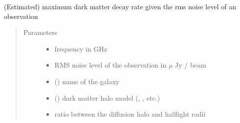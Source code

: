 \documentclass[letterpaper,10pt,english]{sphinxmanual}
\begin{document}
\begin{fulllineitems}
\label{\detokenize{diffsph:diffsph.limits.decay_rate_limest}}
\sphinxAtStartPar
(Estimated) maximum dark matter decay rate given the rms noise level of an observation
\begin{quote}\begin{description}
\item[{Parameters}] \leavevmode\begin{itemize}
\item {} 
\sphinxAtStartPar
{} \textendash{} frequency in GHz

\item {} 
\sphinxAtStartPar
{} \textendash{} RMS noise level of the observation in \(\mu\) Jy / beam

\item {} 
\sphinxAtStartPar
{} () \textendash{} name of the galaxy

\item {} 
\sphinxAtStartPar
{} () \textendash{} dark matter halo model (, , etc.)

\item {} 
\sphinxAtStartPar
{} \textendash{} ratio between the diffusion halo and half\sphinxhyphen{}light radii


\end{itemize}
\end{description}
\end{quote}
\end{fulllineitems}
\end{document}
